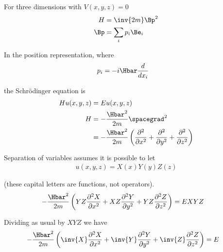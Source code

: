 %
%
For three dimensions with \(V(x,y,z) = 0\)
%
\begin{equation}\label{eqn:lecture5BigReviewCh4FreeParticle:20}
\begin{aligned}
H &= \inv{2m} \Bp^2 \\
\Bp &= \sum_i p_i \Be_i \\
\end{aligned}
\end{equation}

In the position representation, where
%
\begin{equation}\label{eqn:lecture5BigReviewCh4FreeParticle:40}
\begin{aligned}
p_i &= -i \Hbar \frac{d}{dx_i}
\end{aligned}
\end{equation}

the Schr\"{o}dinger equation is
\begin{equation}\label{eqn:lecture5BigReviewCh4FreeParticle:60}
\begin{aligned}
H u(x,y,z) &= E u(x,y,z) \\
H &= -\frac{\Hbar^2}{2m} \spacegrad^2 \\
&= -\frac{\Hbar^2}{2m} \left(
\frac{\partial^2}{\partial {x}^2}
+\frac{\partial^2}{\partial {y}^2}
+\frac{\partial^2}{\partial {z}^2}
\right)
\end{aligned}
\end{equation}

Separation of variables assumes it is possible to let
%
\begin{equation}\label{eqn:lecture5BigReviewCh4FreeParticle:80}
\begin{aligned}
u(x,y,z) = X(x) Y(y) Z(z)
\end{aligned}
\end{equation}

(these capital letters are functions, not operators).
%
\begin{equation}\label{eqn:lecture5BigReviewCh4FreeParticle:100}
\begin{aligned}
-\frac{\Hbar^2}{2m} \left(
YZ \frac{\partial^2 X}{\partial {x}^2}
+ XZ \frac{\partial^2 Y}{\partial {y}^2}
+ YZ \frac{\partial^2 Z}{\partial {z}^2}\right)
&= E X Y Z
\end{aligned}
\end{equation}

Dividing as usual by \(XYZ\) we have
%
\begin{equation}\label{eqn:lecture5BigReviewCh4FreeParticle:120}
\begin{aligned}
-\frac{\Hbar^2}{2m} \left(
\inv{X} \frac{\partial^2 X}{\partial {x}^2}
+ \inv{Y} \frac{\partial^2 Y}{\partial {y}^2}
+ \inv{Z} \frac{\partial^2 Z}{\partial {z}^2} \right)
&= E
\end{aligned}
\end{equation}

